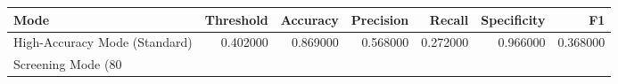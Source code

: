 \begin{tabular}{lrrrrrr}
\toprule
Mode & Threshold & Accuracy & Precision & Recall & Specificity & F1 \\
\midrule
High-Accuracy Mode (Standard) & 0.402000 & 0.869000 & 0.568000 & 0.272000 & 0.966000 & 0.368000 \\
Screening Mode (80%
\bottomrule
\end{tabular}
